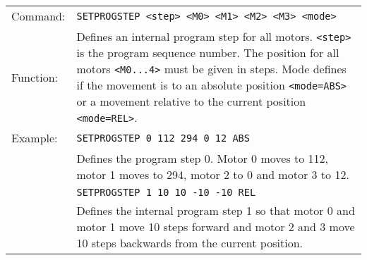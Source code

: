 \begin{table}[!htbp]
  \begin{tabularx}{\textwidth}{lX}
    Command:  & \texttt{SETPROGSTEP <step> <M0> <M1> <M2> <M3> <mode>}\\
    Function: & Defines an internal program step for all motors. \texttt{<step>}
                is the program sequence number. The position for all motors 
                \texttt{<M0...4>} must be given in steps. Mode defines if
                the movement is to an absolute position \texttt{<mode=ABS>}
                or a movement relative to the current position \texttt{<mode=REL>}.\\
    Example:  & \texttt{SETPROGSTEP 0 112 294 0 12 ABS}\\
              & Defines the program step 0. Motor 0 moves to 112,
                motor 1 moves to 294, motor 2 to 0 and motor 3 to 12.\\
              & \texttt{SETPROGSTEP 1 10 10 -10 -10 REL}\\
              & Defines the internal program step 1 so that motor 0 and motor 1 move
                10 steps forward and motor 2 and 3 move 10 steps backwards from the
                current position.
  \end{tabularx}
\end{table}

\vspace{\vdistace}

